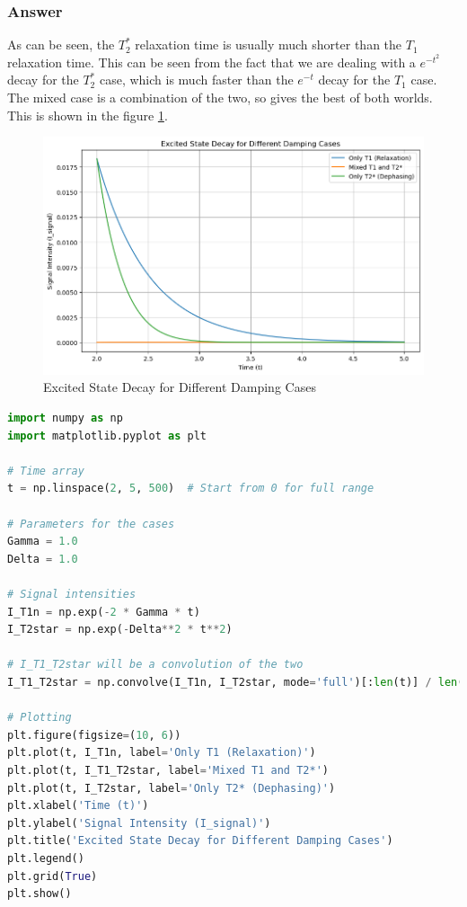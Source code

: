 \documentclass[12pt]{article}
\begin{document}
\subsubsection{Answer}
As can be seen, the $T_2^*$ relaxation time is usually much shorter than the $T_1$ relaxation time. This can be seen from the fact that we are dealing with a $e^{-t^2}$ decay for the $T_2^*$ case, which is much faster than the $e^{-t}$ decay for the $T_1$ case. The mixed case is a combination of the two, so gives the best of both worlds. This is shown in the figure \ref{fig:decay}.
\begin{figure}
    \centering
    \includegraphics[max width=\textwidth]{output.png}
\caption{Excited State Decay for Different Damping Cases}
\label{fig:decay}
\end{figure}
\begin{lstlisting}[language=Python]
import numpy as np
import matplotlib.pyplot as plt

# Time array
t = np.linspace(2, 5, 500)  # Start from 0 for full range

# Parameters for the cases
Gamma = 1.0
Delta = 1.0

# Signal intensities
I_T1n = np.exp(-2 * Gamma * t)
I_T2star = np.exp(-Delta**2 * t**2)

# I_T1_T2star will be a convolution of the two
I_T1_T2star = np.convolve(I_T1n, I_T2star, mode='full')[:len(t)] / len(t) # Normalize

# Plotting
plt.figure(figsize=(10, 6))
plt.plot(t, I_T1n, label='Only T1 (Relaxation)')
plt.plot(t, I_T1_T2star, label='Mixed T1 and T2*')
plt.plot(t, I_T2star, label='Only T2* (Dephasing)')
plt.xlabel('Time (t)')
plt.ylabel('Signal Intensity (I_signal)')
plt.title('Excited State Decay for Different Damping Cases')
plt.legend()
plt.grid(True)
plt.show()
\end{lstlisting}
\newpage
\end{document}
